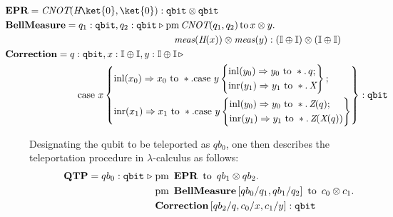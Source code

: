 \begin{align*}
   & \hspace{-25pt} \textbf{EPR} =  \emph{CNOT} (\emph{H}\ket{0},\ket{0}) : \mathtt{qbit} \otimes
   \mathtt{qbit}  \\ 
   &\hspace{-25pt}\textbf{BellMeasure} =  q_{1}: \mathtt{qbit}, q_{2}: \mathtt{qbit}
   \vljud  \text{pm} \, \textit{CNOT} (q_{1},q_{2})
  \,  \text{to}\, x \otimes y. \,
    \\
   & \hspace{150pt} \textit{meas} (\textit{H} (x)) \otimes \textit{meas} (y) : \left(\typeI\oplus \typeI\right) \otimes \left(\typeI\oplus
   \typeI\right) \\
   &\hspace{-25pt}\textbf{Correction}= q: \mathtt{qbit}, x: \typeI \oplus \typeI,  y:
        \typeI \oplus \typeI \, \vljud \\
    &\hspace{50pt} \text{case } x \left\{ 
        \begin{aligned} 
          & \inl (x_{0}) \Rightarrow x_0 \text{ to } \ast. \text{case } y \left\{
                \begin{aligned}
                  &\inl (y_{0})  \Rightarrow  y_0 \text{ to } \ast.
                        \, q; \\
                  &\inr (y_{1}) \Rightarrow y_1 \text{ to } \ast. \, \emph{X}
                \end{aligned} \right\}; \\
          & \inr (x_{1})  \Rightarrow x_1 \text{ to } \ast. \text{case } y \left\{
                \begin{aligned}
                  &  \inl (y_{0})  \Rightarrow
        y_0 \text{ to } \ast. \, \emph{Z}(q); \\
                  &\inr (y_{1}) \Rightarrow{} y_1 \text{ to } \ast. \, \emph{Z}
(\emph{X}(q))
                \end{aligned} \right\}
        \end{aligned}\right\} : \mathtt{qbit}
\end{align*}

Designating the qubit to be teleported as $qb_0$, one then describes the
teleportation procedure in $\lambda$-calculus as follows:
 \begin{align*}
  \textbf{QTP} = qb_{0}: \mathtt{qbit}\hspace{3 pt} \triangleright \hspace{3 pt} & \text{pm} \hspace{5pt} \textbf{EPR} \hspace{5pt} \text{to} \hspace{5pt}  qb_{1} \otimes qb_{2}.  \notag \\
     & \text{pm}\hspace{5pt} \textbf{BellMeasure}\, [qb_0/q_1,qb_{1}/q_2] \hspace{5pt}  \text{to} \hspace{5pt} c_{0}\otimes c_{1} . \notag \\
     & \textbf{Correction}\, [qb_{2}/q,c_{0}/x, c_{1}/y] 
     : \mathtt{qbit} 
 \end{align*}


